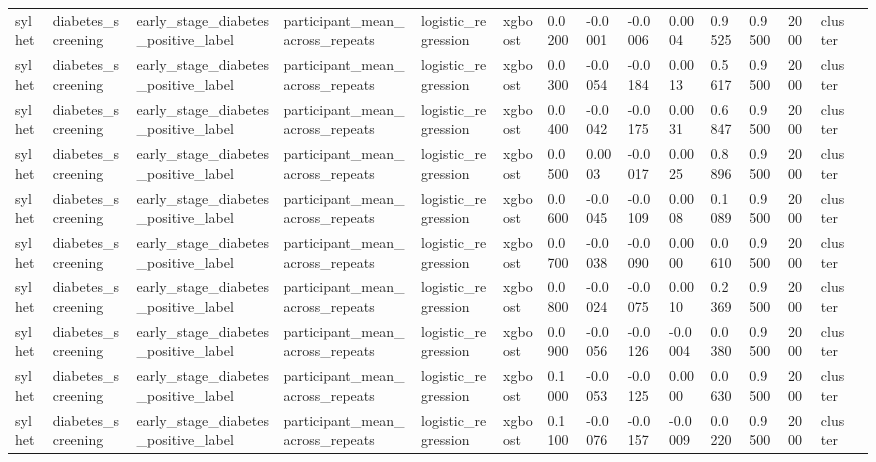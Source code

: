 \begin{tabular}{lllllllllllllll}
sylhet & diabetes\_screening & early\_stage\_diabetes\_positive\_label & participant\_mean\_across\_repeats & logistic\_regression & xgboost & 0.0200 & -0.0001 & -0.0006 & 0.0004 & 0.9525 & 0.9500 & 2000 & cluster &  \\
sylhet & diabetes\_screening & early\_stage\_diabetes\_positive\_label & participant\_mean\_across\_repeats & logistic\_regression & xgboost & 0.0300 & -0.0054 & -0.0184 & 0.0013 & 0.5617 & 0.9500 & 2000 & cluster &  \\
sylhet & diabetes\_screening & early\_stage\_diabetes\_positive\_label & participant\_mean\_across\_repeats & logistic\_regression & xgboost & 0.0400 & -0.0042 & -0.0175 & 0.0031 & 0.6847 & 0.9500 & 2000 & cluster &  \\
sylhet & diabetes\_screening & early\_stage\_diabetes\_positive\_label & participant\_mean\_across\_repeats & logistic\_regression & xgboost & 0.0500 & 0.0003 & -0.0017 & 0.0025 & 0.8896 & 0.9500 & 2000 & cluster &  \\
sylhet & diabetes\_screening & early\_stage\_diabetes\_positive\_label & participant\_mean\_across\_repeats & logistic\_regression & xgboost & 0.0600 & -0.0045 & -0.0109 & 0.0008 & 0.1089 & 0.9500 & 2000 & cluster &  \\
sylhet & diabetes\_screening & early\_stage\_diabetes\_positive\_label & participant\_mean\_across\_repeats & logistic\_regression & xgboost & 0.0700 & -0.0038 & -0.0090 & 0.0000 & 0.0610 & 0.9500 & 2000 & cluster &  \\
sylhet & diabetes\_screening & early\_stage\_diabetes\_positive\_label & participant\_mean\_across\_repeats & logistic\_regression & xgboost & 0.0800 & -0.0024 & -0.0075 & 0.0010 & 0.2369 & 0.9500 & 2000 & cluster &  \\
sylhet & diabetes\_screening & early\_stage\_diabetes\_positive\_label & participant\_mean\_across\_repeats & logistic\_regression & xgboost & 0.0900 & -0.0056 & -0.0126 & -0.0004 & 0.0380 & 0.9500 & 2000 & cluster &  \\
sylhet & diabetes\_screening & early\_stage\_diabetes\_positive\_label & participant\_mean\_across\_repeats & logistic\_regression & xgboost & 0.1000 & -0.0053 & -0.0125 & 0.0000 & 0.0630 & 0.9500 & 2000 & cluster &  \\
sylhet & diabetes\_screening & early\_stage\_diabetes\_positive\_label & participant\_mean\_across\_repeats & logistic\_regression & xgboost & 0.1100 & -0.0076 & -0.0157 & -0.0009 & 0.0220 & 0.9500 & 2000 & cluster &  \\

\end{tabular}
